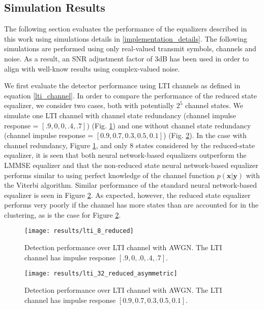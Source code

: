 \subsection{Simulation Results}\label{real_results}
The following section evaluates the performance of the equalizers described in this work using simulations details in \ref{implementation_details}. 
The following simulations are performed using only real-valued transmit symbols, channels and noise. As a result, an SNR adjustment factor of 3dB has been used in order to align with well-know results using complex-valued noise. 
\par
We first evaluate the detector performance using LTI channels as defined in equation \eqref{lti_channel}. In order to compare the performance of the reduced state equalizer, we consider two cases, both with potentially $2^5$ channel states. We simulate one LTI channel with channel state redundancy (channel impulse response = $[.9, 0, 0, .4, .7]$) (Fig. \ref{fig:LTI performance redundant}) and one without channel state redundancy (channel impulse response = $[0.9, 0.7, 0.3, 0.5, 0.1]$) (Fig. \ref{fig:LTI performance}). In the case with channel redundancy, Figure \ref{fig:LTI performance redundant}, and only 8 states considered by the reduced-state equalizer, it is seen that both neural network-based equalizers outperform the LMMSE equalizer and that the non-reduced state neural network-based equalizer performs similar to using perfect knowledge of the channel function $p(\mathbf{x}|\mathbf{y})$ with the Viterbi algorithm. Similar performance of the standard neural network-based equalizer is seen in  Figure \ref{fig:LTI performance}. As expected, however, the reduced state equalizer performs very poorly if the channel has more states than are accounted for in the clustering, as is the case for Figure \ref{fig:LTI performance}.
\begin{figure}[H]
	\texttt{[image: results/lti\_8\_reduced]}
		  \caption{Detection performance over LTI channel with AWGN. The LTI channel has impulse response  $[.9, 0, .0, .4, .7]$.}
	  \label{fig:LTI performance redundant}
\end{figure}
\begin{figure}[H]
	\texttt{[image: results/lti\_32\_reduced\_asymmetric]}
		  \caption{Detection performance over LTI channel with AWGN.  The LTI channel has impulse response  $[0.9, 0.7, 0.3, 0.5, 0.1]$.}
	  	  \label{fig:LTI performance}

\end{figure}
